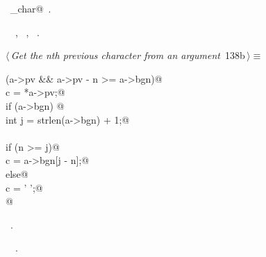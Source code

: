 \documentclass[a4paper]{report}
\begin{document}
\begin{flushleft}
\begin{minipage}{\linewidth}
\begin{list}{}{\setlength{\itemsep}{-\parsep}\setlength{\itemindent}{-\leftmargin}}
\item \NWtxtIdentsDefed\nobreak\  \verb@prev_char@\nobreak\ .\item \NWtxtIdentsUsed\nobreak\  \verb@ArgManager@\nobreak\ , \verb@ArgMgr@\nobreak\ , \verb@Manager@\nobreak\ .
\item{}
\end{list}
\end{minipage}\vspace{4ex}
\end{flushleft}
\begin{flushleft} \small
\begin{minipage}{\linewidth}\label{scrap301}\raggedright\small
{} $\langle\,${\it Get the nth previous character from an argument}\nobreak\ {\footnotesize {138b}}$\,\rangle\equiv$
\vspace{-1ex}
\begin{list}{}{} \item
\mbox{}\verb@if (a->pv && a->pv - n >= a->bgn)@\\
\mbox{}\verb@   c = *a->pv;@\\
\mbox{}\verb@else if (a->bgn) {@\\
\mbox{}\verb@   int j = strlen(a->bgn) + 1;@\\
\mbox{}\verb@@\\
\mbox{}\verb@   if (n >= j)@\\
\mbox{}\verb@      c = a->bgn[j - n];@\\
\mbox{}\verb@   else@\\
\mbox{}\verb@      c = ' ';@\\
\mbox{}\verb@}@\\
\mbox{}\verb@@{\NWsep}
\end{list}
\vspace{-1.5ex}
\footnotesize
\begin{list}{}{\setlength{\itemsep}{-\parsep}\setlength{\itemindent}{-\leftmargin}}
\item \NWtxtMacroRefIn\ .
\item \NWtxtIdentsUsed\nobreak\  \verb@strlen@\nobreak\ .
\item{}
\end{list}
\end{minipage}\vspace{4ex}
\end{flushleft}
\end{document}
